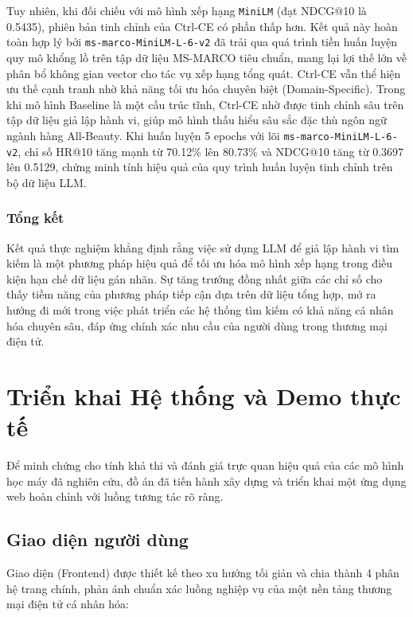 Tuy nhiên, khi đối chiếu với mô hình xếp hạng \texttt{MiniLM} (đạt NDCG@10 là 0.5435), phiên bản tinh chỉnh của Ctrl-CE có phần thấp hơn. Kết quả này hoàn toàn hợp lý bởi \texttt{ms-marco-MiniLM-L-6-v2} đã trải qua quá trình tiền huấn luyện quy mô khổng lồ trên tập dữ liệu MS-MARCO tiêu chuẩn, mang lại lợi thế lớn về phân bổ không gian vector cho tác vụ xếp hạng tổng quát. Ctrl-CE vẫn thể hiện ưu thế cạnh tranh nhờ khả năng tối ưu hóa chuyên biệt (Domain-Specific). Trong khi mô hình Baseline là một cấu trúc tĩnh, Ctrl-CE nhờ được tinh chỉnh sâu trên tập dữ liệu giả lập hành vi, giúp mô hình thấu hiểu sâu sắc đặc thù ngôn ngữ ngành hàng All-Beauty. Khi huấn luyện 5 epochs với lõi \texttt{ms-marco-MiniLM-L-6-v2}, chỉ số HR@10 tăng mạnh từ 70.12\% lên 80.73\% và NDCG@10 tăng từ 0.3697 lên 0.5129, chứng minh tính hiệu quả của quy trình huấn luyện tinh chỉnh trên bộ dữ liệu LLM.

\subsubsection*{Tổng kết}
Kết quả thực nghiệm khẳng định rằng việc sử dụng LLM để giả lập hành vi tìm kiếm là một phương pháp hiệu quả để tối ưu hóa mô hình xếp hạng trong điều kiện hạn chế dữ liệu gán nhãn. Sự tăng trưởng đồng nhất giữa các chỉ số cho thấy tiềm năng của phương pháp tiếp cận dựa trên dữ liệu tổng hợp, mở ra hướng đi mới trong việc phát triển các hệ thống tìm kiếm có khả năng cá nhân hóa chuyên sâu, đáp ứng chính xác nhu cầu của người dùng trong thương mại điện tử.

\section{Triển khai Hệ thống và Demo thực tế}
Để minh chứng cho tính khả thi và đánh giá trực quan hiệu quả của các mô hình học máy đã nghiên cứu, đồ án đã tiến hành xây dựng và triển khai một ứng dụng web hoàn chỉnh với luồng tương tác rõ ràng.

\subsection{Giao diện người dùng}
Giao diện (Frontend) được thiết kế theo xu hướng tối giản và chia thành 4 phân hệ trang chính, phản ánh chuẩn xác luồng nghiệp vụ của một nền tảng thương mại điện tử cá nhân hóa:

